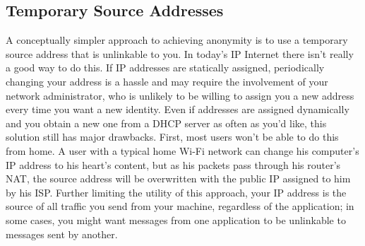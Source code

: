 \documentclass{article}
\begin{document}
\subsection{Temporary Source Addresses}
\label{temp-ids}
A conceptually simpler approach to achieving anonymity is to use a temporary source address that is unlinkable to you. In today's IP Internet there isn't really a good way to do this. If IP addresses are statically assigned, periodically changing your address is a hassle and may require the involvement of your network administrator, who is unlikely to be willing to assign you a new address every time you want a new identity. Even if addresses are assigned dynamically and you obtain a new one from a DHCP server as often as you'd like, this solution still has major drawbacks. First, most users won't be able to do this from home. A user with a typical home Wi-Fi network can change his computer's IP address to his heart's content, but as his packets pass through his router's NAT, the source address will be overwritten with the public IP assigned to him by his ISP. Further limiting the utility of this approach, your IP address is the source of all traffic you send from your machine, regardless of the application; in some cases, you might want messages from one application to be unlinkable to messages sent by another.
\end{document}
